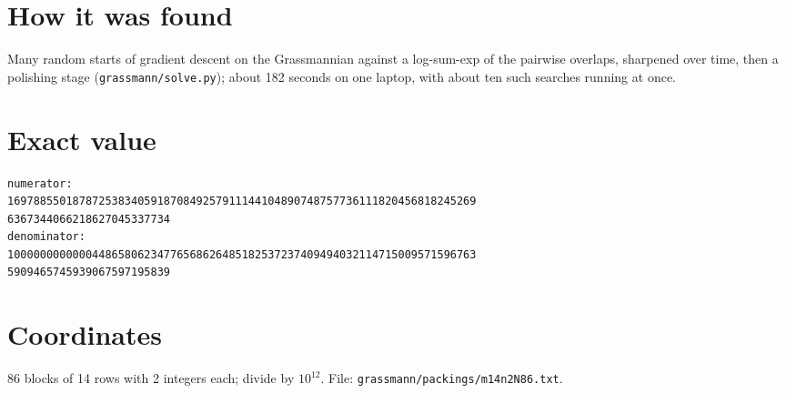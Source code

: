 \documentclass[11pt,a4paper]{article}
\begin{document}
\section{How it was found}
Many random starts of gradient descent on the Grassmannian against a log-sum-exp of the pairwise overlaps, sharpened over time, then a polishing stage (\texttt{grassmann/solve.py}); about 182 seconds on one laptop, with about ten such searches running at once.


\appendix
\section{Exact value}
{\small
\begin{verbatim}
numerator:
169788550187872538340591870849257911144104890748757736111820456818245269
6367344066218627045337734
denominator:
100000000000044865806234776568626485182537237409494032114715009571596763
5909465745939067597195839
\end{verbatim}}

\section{Coordinates}
86 blocks of 14 rows with 2 integers each; divide by $10^{12}$. File: \texttt{grassmann/packings/m14n2N86.txt}.
{\tiny
\begin{multicols}{4}
\end{multicols}}
\end{document}
